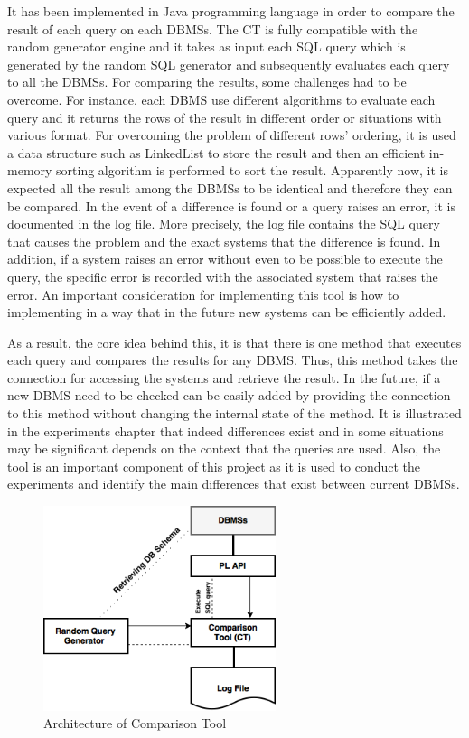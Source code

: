 It has been implemented in Java programming language in order to compare the result of each query on each DBMSs. The CT is fully compatible with the random generator engine and it takes as input each SQL query which is generated by the random SQL generator and subsequently evaluates each query to all the DBMSs. For comparing the results, some challenges had to be overcome. For instance, each DBMS use different algorithms to evaluate each query and it returns the rows of the result in different order or situations with various format. For overcoming  the problem of different rows’ ordering, it is used a data structure such as LinkedList to store the result and then an efficient in-memory sorting algorithm is performed to sort the result. Apparently now, it is expected all the result among the DBMSs to be identical and therefore they can be compared. In the event of a difference is found or a query raises an error, it is documented in the log file. More precisely, the log file contains the SQL query that causes the problem and the exact systems that the difference is found. In addition, if a system raises an error without even to be possible to execute the query, the specific error is recorded with the associated system that raises the error. An important consideration for implementing this tool is how to implementing in a way that in the future new systems can be efficiently added. 

As a result, the core idea behind this, it is that there is one method that executes each query and compares the results for any DBMS. Thus, this method takes the connection for accessing the systems and retrieve the result. In the future, if a new DBMS need to be checked can be easily added by providing the connection to this method without changing the internal state of the method.  
 It is illustrated in the experiments chapter  that indeed differences exist and in some situations may be significant depends on the context that the queries are used. Also, the tool is an important component of this project as it is used to conduct the experiments and identify the main differences that exist between current DBMSs. 

 \begin{figure} 
      \centering
      \includegraphics[width=\textwidth,height=6cm]{Images/3-ComparisonTool}
      \caption{Architecture of Comparison Tool}
      \label{fig:counting-methods}
  \end{figure}


